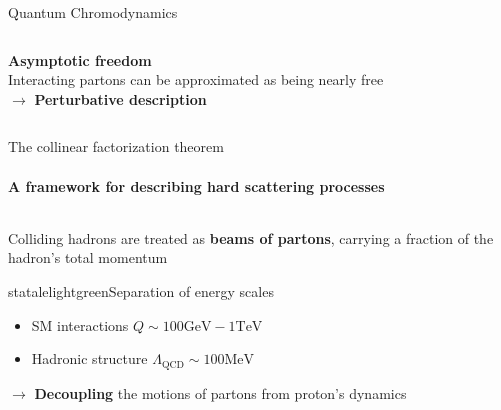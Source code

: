 \begin{frame} {Quantum Chromodynamics}
\begin{columns}
\begin{column}{0.5\textwidth}
      \textbf{Asymptotic freedom} \\
      Interacting partons can be approximated as being nearly free\\
      $\to$ \textbf{Perturbative description}
    
    \end{column}

    \end{columns}
  
\end{frame}



\begin{frame} {The collinear factorization theorem}
  \framesubtitle{A framework for describing hard scattering processes}
    
   \begin{columns}

    \begin{column}{0.6\textwidth}
    Colliding hadrons are treated as \textbf{beams of partons}, carrying a fraction of the hadron's total momentum
    
   \begin{colorblock}[black]{statalelightgreen}{Separation of energy scales}
        \begin{itemize}
          \item SM interactions $Q \sim 100 \text{GeV}-1\text{TeV}$
          \item Hadronic structure $\Lambda_{\mathrm{QCD}}\sim 100\text{MeV}$
        \end{itemize}
      \end{colorblock}
\begin{centering}
    $\to$ \textbf{Decoupling} the motions of partons from proton's dynamics
\end{centering}
    
    \end{column}


\end{columns}
\end{frame}
